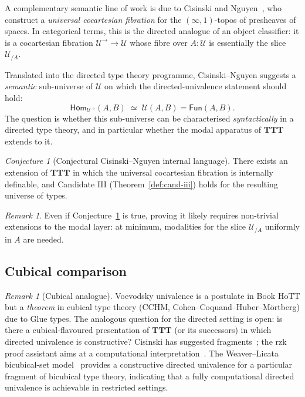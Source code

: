 \documentclass[12pt]{article}
\theoremstyle{definition}
\theoremstyle{remark}
\newtheorem{remark}[theorem]{Remark}
\newtheorem{conjecture}[theorem]{Conjecture}
\newcommand{\U}{\mathcal{U}}
\newcommand{\Hom}{\mathsf{Hom}}
\newcommand{\Fun}{\mathsf{Fun}}
\newcommand{\eqv}{\simeq}
\newcommand{\TTT}{\mathbf{TTT}}
\begin{document}
A complementary semantic line of work is due to Cisinski and Nguyen~\cite{CisinskiNguyen}, who construct a \emph{universal cocartesian fibration} for the $(\infty,1)$-topos of presheaves of spaces. In categorical terms, this is the directed analogue of an object classifier: it is a cocartesian fibration $\mathcal{U}^{\to} \to \mathcal{U}$ whose fibre over $A : \mathcal{U}$ is essentially the slice $\mathcal{U}_{/A}$.

Translated into the directed type theory programme, Cisinski--Nguyen suggests a \emph{semantic} sub-universe of $\U$ on which the directed-univalence statement should hold:
\[
\Hom_{\mathcal{U}^{\to}}(A, B) \;\eqv\; \mathcal{U}(A, B) = \Fun(A, B).
\]
The question is whether this sub-universe can be characterised \emph{syntactically} in a directed type theory, and in particular whether the modal apparatus of $\TTT$ extends to it.

\begin{conjecture}[Conjectural Cisinski--Nguyen internal language]\label{conj:cn-internal}
There exists an extension of $\TTT$ in which the universal cocartesian fibration is internally definable, and Candidate III (Theorem~\ref{def:cand-iii}) holds for the resulting universe of types.
\end{conjecture}

\begin{remark}
Even if Conjecture~\ref{conj:cn-internal} is true, proving it likely requires non-trivial extensions to the modal layer: at minimum, modalities for the slice $\mathcal{U}_{/A}$ uniformly in $A$ are needed.
\end{remark}

\subsection{Cubical comparison}

\begin{remark}[Cubical analogue]\label{rem:cubical}
Voevodsky univalence is a postulate in Book HoTT but a \emph{theorem} in cubical type theory (CCHM, Cohen--Coquand--Huber--M\"ortberg) due to Glue types. The analogous question for the directed setting is open: is there a cubical-flavoured presentation of $\TTT$ (or its successors) in which directed univalence is constructive? Cisinski has suggested fragments~\cite{Cisinski}; the rzk proof assistant aims at a computational interpretation~\cite{rzk}. The Weaver--Licata bicubical-set model~\cite{KavvosWeaver} provides a constructive directed univalence for a particular fragment of bicubical type theory, indicating that a fully computational directed univalence is achievable in restricted settings.
\end{remark}
\end{document}
